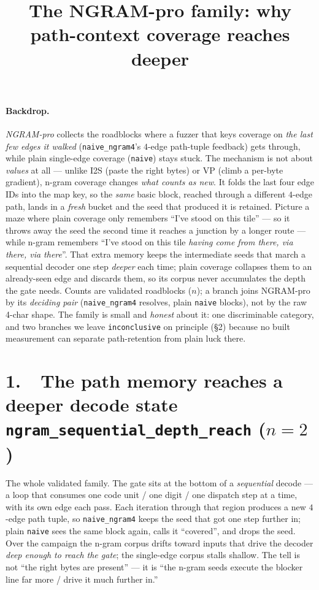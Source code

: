 \documentclass[11pt]{article}
\title{\textbf{The NGRAM-pro family: why path-context coverage reaches deeper}}
\author{}
\date{}
\begin{document}
\maketitle
\vspace{-3em}

\paragraph{Backdrop.} \emph{NGRAM-pro} collects the roadblocks where a fuzzer that
keys coverage on \emph{the last few edges it walked} (\texttt{naive\_ngram4}'s
$4$-edge path-tuple feedback) gets through, while plain single-edge coverage
(\texttt{naive}) stays stuck. The mechanism is not about \emph{values} at all ---
unlike I2S (paste the right bytes) or VP (climb a per-byte gradient), n-gram
coverage changes \emph{what counts as new}. It folds the last four edge IDs into
the map key, so the \emph{same} basic block, reached through a different
$4$-edge path, lands in a \emph{fresh} bucket and the seed that produced it is
retained. Picture a maze where plain coverage only remembers ``I've stood on this
tile'' --- so it throws away the seed the second time it reaches a junction by a
longer route --- while n-gram remembers ``I've stood on this tile \emph{having
come from there, via there, via there}''. That extra memory keeps the
intermediate seeds that march a sequential decoder one step \emph{deeper} each
time; plain coverage collapses them to an already-seen edge and discards them, so
its corpus never accumulates the depth the gate needs. Counts are validated
roadblocks ($n$); a branch joins NGRAM-pro by its \emph{deciding pair}
(\texttt{naive\_ngram4} resolves, plain \texttt{naive} blocks), not by the raw
4-char shape. The family is small and \emph{honest} about it: one discriminable
category, and two branches we leave \texttt{inconclusive} on principle (\S2)
because no built measurement can separate path-retention from plain luck there.

\section*{1.\ \ The path memory reaches a deeper decode state \hfill {\footnotesize\texttt{ngram\_sequential\_depth\_reach} ($n=2$)}}
The whole validated family. The gate sits at the bottom of a \emph{sequential}
decode --- a loop that consumes one code unit / one digit / one dispatch step at a
time, with its own edge each pass. Each iteration through that region produces a
new $4$-edge path tuple, so \texttt{naive\_ngram4} keeps the seed that got one
step further in; plain \texttt{naive} sees the same block again, calls it
``covered'', and drops the seed. Over the campaign the n-gram corpus drifts toward
inputs that drive the decoder \emph{deep enough to reach the gate}; the
single-edge corpus stalls shallow. The tell is not ``the right bytes are present''
--- it is ``the n-gram seeds execute the blocker line far more / drive it much
further in.''
\end{document}
